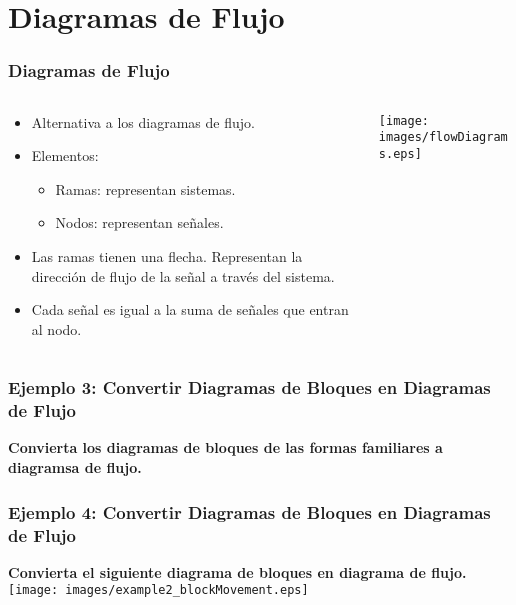 \documentclass[aspectratio=169,handout]{beamer}
\theoremstyle{definition}
\theoremstyle{plain}
\theoremstyle{remark}
\begin{document}
\section{Diagramas de Flujo}
\begin{frame}[<+->]\frametitle{Diagramas de Flujo}
\begin{columns}
\begin{column}{0.5\textwidth}
\begin{itemize}
	\item Alternativa a los diagramas de flujo.
	\item Elementos:
	\begin{itemize}
		\item Ramas: representan sistemas.
		\item Nodos: representan señales.
	\end{itemize}
	\item Las ramas tienen una flecha. Representan la dirección de flujo de la señal a través del sistema.
	\item Cada señal es igual a la suma de señales que entran al nodo.
\end{itemize}
\end{column}	
\begin{column}{0.5\textwidth}
\centering
\vspace*{5mm}
\texttt{[image: images/flowDiagrams.eps]}	
\end{column}	
\end{columns}
\end{frame}

\begin{frame}[<+->]\frametitle{Ejemplo 3: Convertir Diagramas de Bloques en Diagramas de Flujo}
\textbf{Convierta los diagramas de bloques de las formas familiares a diagramsa de flujo.}\\
\end{frame}

\begin{frame}[<+->]\frametitle{Ejemplo 4: Convertir Diagramas de Bloques en Diagramas de Flujo}
\textbf{Convierta el siguiente diagrama de bloques en diagrama de flujo.}\\
\centering
\vspace*{5mm}
\texttt{[image: images/example2\_blockMovement.eps]}	
\end{frame}
\end{document}
